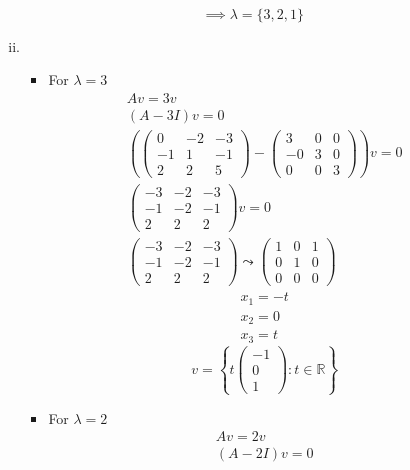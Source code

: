 \begin{enumerate}
\begin{enumerate}[(i)]
\begin{align}
\end{align}
\begin{equation}
\implies \lambda = \{3,2,1\}
\end{equation}
\item 
\begin{itemize}
\item For $\lambda=3$
\begin{gather}
Av = 3v\\
(A-3I)v=0\\
\left(
\begin{pmatrix}
0 & -2 & -3\\
-1 & 1 & -1\\
2 &  2 & 5
\end{pmatrix}
-
\begin{pmatrix}
3& 0 & 0\\
-0 & 3 & 0\\
0 & 0 & 3
\end{pmatrix}
\right)v=0\\
\begin{pmatrix}
-3 & -2 & -3\\
-1 & -2 & -1\\
2 & 2 & 2
\end{pmatrix}
v=0\\
\begin{pmatrix}
-3 & -2 & -3\\
-1 & -2 & -1\\
2 & 2 & 2
\end{pmatrix}
\leadsto
\begin{pmatrix}
1 & 0 & 1\\
0 & 1 & 0\\
0 & 0 & 0
\end{pmatrix}
\end{gather}
\begin{align}
x_1 = -t\\
x_2 = 0\\
x_3 = t
\end{align}
\begin{equation}
v =\left\{t\begin{pmatrix}-1\\0\\1\end{pmatrix}\colon t \in \mathbb{R}\right\}
\end{equation}
\item For $\lambda=2$
\begin{gather}
Av = 2v\\
(A-2I)v=0\\

\end{gather}
\end{itemize}
\end{enumerate}
\end{enumerate}
